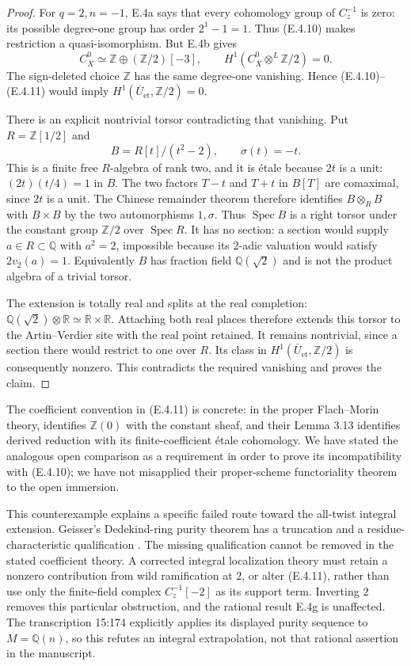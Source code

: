 \begin{proof}
For $q=2,n=-1$, E.4a says that every cohomology group of $C_z^{-1}$
is zero: its possible degree-one group has order $2^1-1=1$.
Thus (E.4.10) makes restriction a quasi-isomorphism.
But E.4b gives
\[
 C_{\overline X}^0\simeq
 \mathbb Z\oplus(\mathbb Z/2)[-3],
 \qquad
 H^1(C_{\overline X}^0\otimes^L\mathbb Z/2)=0.
\]
The sign-deleted choice $\mathbb Z$ has the same degree-one vanishing.
Hence (E.4.10)--(E.4.11) would imply
$H^1(\overline U_{\mathrm{et}},\mathbb Z/2)=0$.

There is an explicit nontrivial torsor contradicting that vanishing.
Put $R=\mathbb Z[1/2]$ and
\[
 B=R[t]/(t^2-2),\qquad \sigma(t)=-t.
\]
This is a finite free $R$-algebra of rank two, and it is \'etale
because $2t$ is a unit: $(2t)(t/4)=1$ in $B$.
The two factors $T-t$ and $T+t$ in $B[T]$ are comaximal, since
$2t$ is a unit. The Chinese remainder theorem therefore identifies
$B\otimes_R B$ with $B\times B$ by the two automorphisms
$1,\sigma$. Thus $\operatorname{Spec}B$ is a right torsor under the
constant group $\mathbb Z/2$ over $\operatorname{Spec}R$.
It has no section: a section would supply $a\in R\subset\mathbb Q$
with $a^2=2$, impossible because its $2$-adic valuation would satisfy
$2v_2(a)=1$. Equivalently $B$ has fraction field $\mathbb Q(\sqrt2)$
and is not the product algebra of a trivial torsor.

The extension is totally real and splits at the real completion:
$\mathbb Q(\sqrt2)\otimes\mathbb R\simeq\mathbb R\times\mathbb R$.
Attaching both real places therefore extends this torsor to the
Artin--Verdier site with the real point retained. It remains nontrivial,
since a section there would restrict to one over $R$.
Its class in $H^1(\overline U_{\mathrm{et}},\mathbb Z/2)$ is consequently
nonzero. This contradicts the required vanishing and proves the claim.
\end{proof}

The coefficient convention in (E.4.11) is concrete: in the proper
Flach--Morin theory, \citet[Proposition 6.11]{D_FlachMorin2018}
identifies $\mathbb Z(0)$ with the constant sheaf, and their
Lemma 3.13 identifies derived reduction with its finite-coefficient
\'etale cohomology. We have stated the analogous open comparison as
a requirement in order to prove its incompatibility with (E.4.10);
we have not misapplied their proper-scheme functoriality theorem to
the open immersion.

This counterexample explains a specific failed route toward the
all-twist integral extension. Geisser's Dedekind-ring purity theorem
has a truncation and a residue-characteristic qualification
\citep[Theorem 1.2(1)]{D_GeisserDedekind2004}. The missing qualification
cannot be removed in the stated coefficient theory. A corrected
integral localization theory must retain a nonzero contribution from
wild ramification at $2$, or alter (E.4.11), rather than use only the
finite-field complex $C_z^{-1}[-2]$ as its support term. Inverting $2$
removes this particular obstruction, and the rational result E.4g
is unaffected. The transcription 15:174 explicitly applies its displayed
purity sequence to $M=\mathbb Q(n)$, so this refutes an integral
extrapolation, not that rational assertion in the manuscript.

